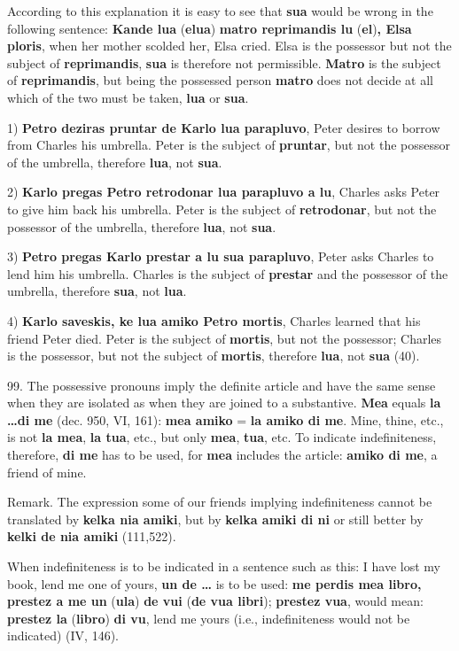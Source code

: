 According to this explanation it is easy to see that \textbf{sua} would be wrong in the following sentence: \textbf{Kande lua }(\textbf{elua})\textbf{ matro reprimandis lu }(\textbf{el})\textbf{, Elsa ploris}, when her mother scolded her, Elsa cried. Elsa is the possessor but not the subject of \textbf{reprimandis}, \textbf{sua} is therefore not permissible. \textbf{Matro} is the subject of \textbf{reprimandis}, but being the possessed person \textbf{matro} does not decide at all which of the two must be taken, \textbf{lua} or \textbf{sua}. 

1) \textbf{Petro deziras pruntar de Karlo lua parapluvo}, Peter desires to borrow from Charles his umbrella. Peter is the subject of \textbf{pruntar}, but not the possessor of the umbrella, therefore \textbf{lua}, not \textbf{sua}. 

2) \textbf{Karlo pregas Petro retrodonar lua parapluvo a lu}, Charles asks Peter to give him back his umbrella. Peter is the subject of \textbf{retrodonar}, but not the possessor of the umbrella, therefore \textbf{lua}, not \textbf{sua}. 

3) \textbf{Petro pregas Karlo prestar a lu sua parapluvo}, Peter asks Charles to lend him his umbrella. Charles is the subject of \textbf{prestar} and the possessor of the umbrella, therefore \textbf{sua}, not \textbf{lua}. 

4) \textbf{Karlo saveskis, ke lua amiko Petro mortis}, Charles learned that his friend Peter died. Peter is the subject of \textbf{mortis}, but not the possessor; Charles is the possessor, but not the subject of \textbf{mortis}, therefore \textbf{lua}, not \textbf{sua} (40). 

99. The possessive pronouns imply the definite article and have the same sense when they are isolated as when they are joined to a substantive. \textbf{Mea} equals \textbf{la \ldots di me} (dec. 950, VI, 161): \textbf{mea amiko} = \textbf{la amiko di me}. Mine, thine, etc., is not \textbf{la mea}, \textbf{la tua}, etc., but only \textbf{mea}, \textbf{tua}, etc. To indicate indefiniteness, therefore, \textbf{di me} has to be used, for \textbf{mea} includes the article: \textbf{amiko di me}, a friend of mine. 

\small Remark. The expression some of our friends implying indefiniteness cannot be translated by \textbf{kelka nia amiki}, but by \textbf{kelka amiki di ni} or still better by \textbf{kelki de nia amiki} (111,522). \normalsize

When indefiniteness is to be indicated in a sentence such as this: I have lost my book, lend me one of yours, \textbf{un de \ldots} is to be used: \textbf{me perdis mea libro, prestez a me un }(\textbf{ula})\textbf{ de vui }(\textbf{de vua libri});\textbf{ prestez vua}, would mean: \textbf{prestez la }(\textbf{libro})\textbf{ di vu}, lend me yours (i.e., indefiniteness would not be indicated) (IV, 146). 

